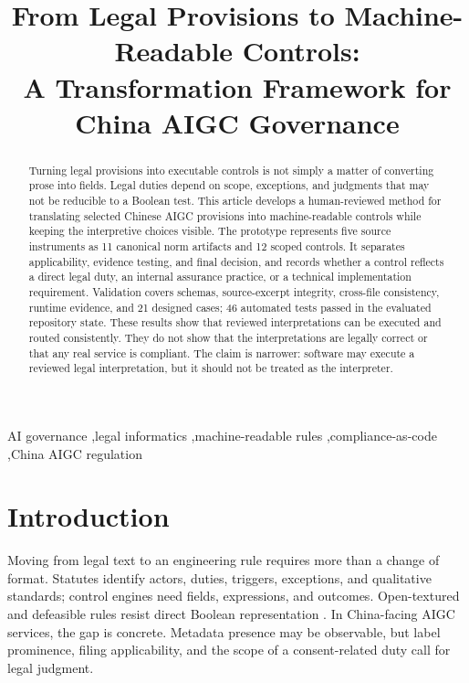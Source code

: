 \documentclass{IOS-Book-Article}
\begin{document}
\begin{frontmatter}

\title{From Legal Provisions to Machine-Readable Controls:\\
A Transformation Framework for China AIGC Governance}
\author{ }
\address{Independent Researcher\\
\href{https://github.com/yuxuancheng123-spec/china-aigc-compliance-evidence}{github.com/yuxuancheng123-spec/china-aigc-compliance-evidence}}

\begin{abstract}
Turning legal provisions into executable controls is not simply a matter of converting prose into fields. Legal duties depend on scope, exceptions, and judgments that may not be reducible to a Boolean test. This article develops a human-reviewed method for translating selected Chinese AIGC provisions into machine-readable controls while keeping the interpretive choices visible. The prototype represents five source instruments as 11 canonical norm artifacts and 12 scoped controls. It separates applicability, evidence testing, and final decision, and records whether a control reflects a direct legal duty, an internal assurance practice, or a technical implementation requirement. Validation covers schemas, source-excerpt integrity, cross-file consistency, runtime evidence, and 21 designed cases; 46 automated tests passed in the evaluated repository state. These results show that reviewed interpretations can be executed and routed consistently. They do not show that the interpretations are legally correct or that any real service is compliant. The claim is narrower: software may execute a reviewed legal interpretation, but it should not be treated as the interpreter.
\end{abstract}

\begin{keyword}
AI governance \sep legal informatics \sep machine-readable rules
\sep compliance-as-code \sep China AIGC regulation
\end{keyword}
\end{frontmatter}

\section{Introduction}

Moving from legal text to an engineering rule requires more than a change of format. Statutes identify actors, duties, triggers, exceptions, and qualitative standards; control engines need fields, expressions, and outcomes. Open-textured and defeasible rules resist direct Boolean representation \cite{prakken1997logical}. In China-facing AIGC services, the gap is concrete. Metadata presence may be observable, but label prominence, filing applicability, and the scope of a consent-related duty call for legal judgment.
\end{document}
